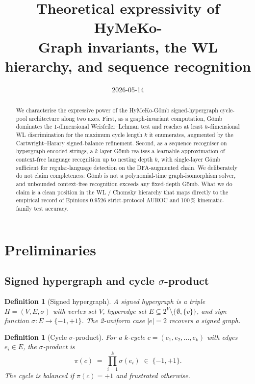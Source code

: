 \documentclass[11pt,a4paper]{article}
\title{Theoretical expressivity of HyMeKo-\Gomb \\ \large{Graph invariants, the WL hierarchy, and sequence recognition}}
\date{2026-05-14}
\author{}
\newtheorem{definition}[theorem]{Definition}
\newcommand{\sig}{\ensuremath{\sigma}}
\newcommand{\Gomb}{G\"omb}
\begin{document}
\maketitle

\begin{abstract}
We characterise the expressive power of the HyMeKo-\Gomb{} signed-hypergraph
cycle-pool architecture along two axes. First, as a graph-invariant
computation, \Gomb{} dominates the 1-dimensional Weisfeiler--Lehman
test and reaches at least $k$-dimensional WL discrimination for the
maximum cycle length $k$ it enumerates, augmented by the
Cartwright--Harary signed-balance refinement. Second, as a
sequence recogniser on hypergraph-encoded strings, a $k$-layer
\Gomb{} realises a learnable approximation of context-free language
recognition up to nesting depth $k$, with single-layer \Gomb{}
sufficient for regular-language detection on the
DFA-augmented chain. We deliberately do not claim completeness:
\Gomb{} is not a polynomial-time graph-isomorphism solver, and
unbounded context-free recognition exceeds any fixed-depth \Gomb.
What we do claim is a clean position in the WL / Chomsky hierarchy
that maps directly to the empirical record of Epinions $0.9526$
strict-protocol AUROC and 100\,\% kinematic-family test accuracy.
\end{abstract}

\section{Preliminaries}

\subsection{Signed hypergraph and cycle $\sigma$-product}

\begin{definition}[Signed hypergraph]
A signed hypergraph is a triple $H = (V, E, \sig)$ with vertex set
$V$, hyperedge set $E \subseteq 2^V \setminus \{\emptyset, \{v\}\}$,
and sign function $\sig: E \to \{-1, +1\}$. The 2-uniform case
$|e| = 2$ recovers a signed graph.
\end{definition}

\begin{definition}[Cycle $\sigma$-product]
For a $k$-cycle $c = (e_1, e_2, \ldots, e_k)$ with edges $e_i \in E$,
the $\sigma$-product is
\[
\pi(c) \;=\; \prod_{i=1}^{k} \sig(e_i) \;\in\; \{-1, +1\}.
\]
The cycle is \emph{balanced} if $\pi(c) = +1$ and \emph{frustrated}
otherwise.
\end{definition}
\end{document}
